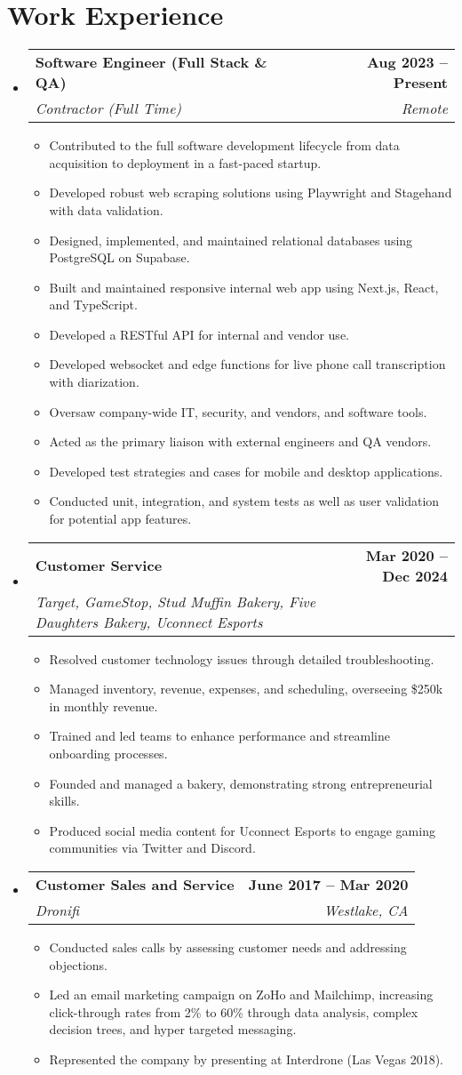 \documentclass[letterpaper,11pt]{article}
\makeatletter
\newcommand{\resumeItem}[1]{
  \item\small{ {#1 \vspace{-2pt}} }
}
\newcommand{\resumeSubheading}[4]{
  \vspace{-2pt}\item
    \begin{tabular*}{1.0\textwidth}[t]{l@{\extracolsep{\fill}}r}
      \textbf{#1} & \textbf{\small #2} \\
      \textit{\small #3} & \textit{\small #4} \\
    \end{tabular*}\vspace{-7pt}
}
\newcommand{\resumeSubHeadingListStart}{\begin{itemize}[leftmargin=0in, label={}]}
\newcommand{\resumeSubHeadingListEnd}{\end{itemize}}
\newcommand{\resumeItemListStart}{\begin{itemize}}
\newcommand{\resumeItemListEnd}{\end{itemize}\vspace{-5pt}}
\makeatother
\begin{document}
\section{Work Experience}
\resumeSubHeadingListStart
    \resumeSubheading
      {Software Engineer (Full Stack \& QA)}{Aug 2023 -- Present}
      {Contractor (Full Time)}{Remote}
      \resumeItemListStart
          \resumeItem{Contributed to the full software development lifecycle from data acquisition to deployment in a fast-paced startup.}
          \resumeItem{Developed robust web scraping solutions using Playwright and Stagehand with data validation.}
          \resumeItem{Designed, implemented, and maintained relational databases using PostgreSQL on Supabase.}
          \resumeItem{Built and maintained responsive internal web app using Next.js, React, and TypeScript.}
          \resumeItem{Developed a RESTful API for internal and vendor use.}
          \resumeItem{Developed websocket and edge functions for live phone call transcription with diarization.}
          \resumeItem{Oversaw company-wide IT, security, and vendors, and software tools.}
          \resumeItem{Acted as the primary liaison with external engineers and QA vendors.}
          \resumeItem{Developed test strategies and cases for mobile and desktop applications.}
          \resumeItem{Conducted unit, integration, and system tests as well as user validation for potential app features.}
      \resumeItemListEnd
    \resumeSubheading
      {Customer Service}{Mar 2020 -- Dec 2024}
      {Target, GameStop, Stud Muffin Bakery, Five Daughters Bakery, Uconnect Esports}{ }
      \resumeItemListStart
          \resumeItem{Resolved customer technology issues through detailed troubleshooting.}
          \resumeItem{Managed inventory, revenue, expenses, and scheduling, overseeing \$250k in monthly revenue.}
          \resumeItem{Trained and led teams to enhance performance and streamline onboarding processes.}
          \resumeItem{Founded and managed a bakery, demonstrating strong entrepreneurial skills.}
          \resumeItem{Produced social media content for Uconnect Esports to engage gaming communities via Twitter and Discord.}
      \resumeItemListEnd
    \resumeSubheading
      {Customer Sales and Service}{June 2017 -- Mar 2020}
      {Dronifi}{Westlake, CA}
      \resumeItemListStart
          \resumeItem{Conducted sales calls by assessing customer needs and addressing objections.}
          \resumeItem{Led an email marketing campaign on ZoHo and Mailchimp, increasing click-through rates from 2\% to 60\% through data analysis, complex decision trees, and hyper targeted messaging.}
          \resumeItem{Represented the company by presenting at Interdrone (Las Vegas 2018).}
      \resumeItemListEnd
\resumeSubHeadingListEnd
\end{document}
